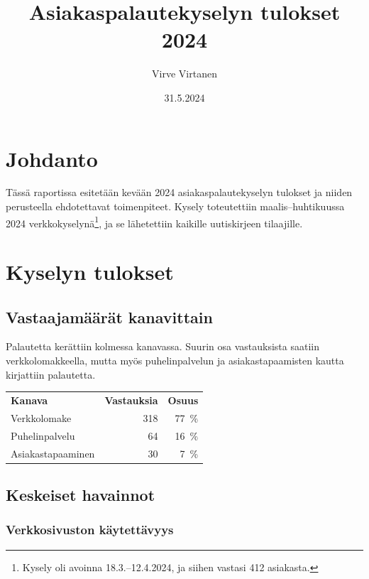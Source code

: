 \documentclass{sfs-2487-2024}
\date{31.5.2024}
\author{Virve Virtanen}
\title{Asiakaspalautekyselyn tulokset 2024}
\begin{document}
\maketitle

\tableofcontents

\section{Johdanto}

Tässä raportissa esitetään kevään 2024 asiakaspalautekyselyn tulokset
ja niiden perusteella ehdotettavat toimenpiteet. Kysely toteutettiin
maalis--huhtikuussa 2024 verkkokyselynä\footnote{Kysely oli avoinna
18.3.--12.4.2024, ja siihen vastasi 412 asiakasta.}, ja se lähetettiin
kaikille uutiskirjeen tilaajille.

\section{Kyselyn tulokset}

\subsection{Vastaajamäärät kanavittain}

Palautetta kerättiin kolmessa kanavassa. Suurin osa vastauksista
saatiin verkkolomakkeella, mutta myös puhelinpalvelun ja
asiakastapaamisten kautta kirjattiin palautetta.

\begin{tabular}{@{}lrr@{}}
  \textbf{Kanava} & \textbf{Vastauksia} & \textbf{Osuus} \\
  Verkkolomake    & 318                 & 77~\%          \\
  Puhelinpalvelu  & 64                  & 16~\%          \\
  Asiakastapaaminen & 30                & 7~\%           \\
\end{tabular}

\subsection{Keskeiset havainnot}

\subsubsection{Verkkosivuston käytettävyys}
\end{document}
